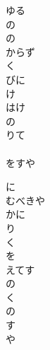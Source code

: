 \documentclass[10pt,b5j]{tarticle} %
\begin{document}
\vspace{1.5em} %
\newcommand{\linespace}{0.5em} %
\newcommand{\blocksize}{0.5\hsize} %
\begin{enumerate} %
    \begin{minipage}[c]{\blocksize}
    
        \vspace{\linespace}
        \item
        ゆる\\
        の\\
        の\\
        からず\\
        く\\
        びに\\
        け\\
        はけ\\
        の\\
        りて\\
        \\
        をすや
        
        \vspace{\linespace}
        \item
        に\\
        むべきや\\
        かに\\
        り\\
        く\\
        を\\
        えてす\\
        の\\
        く\\
        の\\
        す\\
        や
        

\end{minipage}
\end{enumerate}
\end{document}
